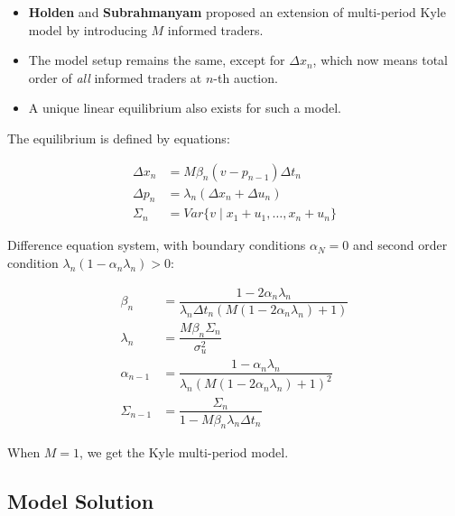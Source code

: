 \documentclass{beamer}
\begin{document}
\begin{frame}
    \begin{itemize}
        \item \textbf{Holden} and \textbf{Subrahmanyam} proposed an extension of multi-period Kyle model by introducing $M$ informed traders.
        \item The model setup remains the same, except for $\Delta x_n$, which now means total order of \textit{all} informed traders at $n$-th auction.
        \item A unique linear equilibrium also exists for such a model.
    \end{itemize}
\end{frame}

\begin{frame}
    The equilibrium is defined by equations:

    \begin{align}
        \Delta x_n &= M\beta_n(v - p_{n-1}) \Delta t_n \\
        \Delta p_n &= \lambda_n(\Delta x_n + \Delta u_n) \\
        \Sigma_n &= Var \{v \mid x_1 + u_1, \ldots, x_n + u_n \}
    \end{align}
\end{frame}

\begin{frame}
    Difference equation system, with boundary conditions $\alpha_N = 0$ and second order condition $\lambda_n (1 - \alpha_n\lambda_n) > 0$:

    \begin{align}
        \beta_n &= \dfrac{1 - 2\alpha_n\lambda_n}{\lambda_n\Delta t_n (M(1 - 2\alpha_n\lambda_n) + 1)} \\
        \lambda_n &= \dfrac{M\beta_n\Sigma_n}{\sigma_u^2} \\
        \alpha_{n-1} &= \dfrac{1 - \alpha_n\lambda_n}{\lambda_{n}(M(1 - 2\alpha_{n}\lambda_{n}) + 1)^2} \\
        \Sigma_{n-1} &= \dfrac{\Sigma_{n}}{1 - M\beta_{n}\lambda_{n}\Delta t_{n}}
    \end{align}

    When $M=1$, we get the Kyle multi-period model.
\end{frame}

\subsection{Model Solution}
\end{document}
